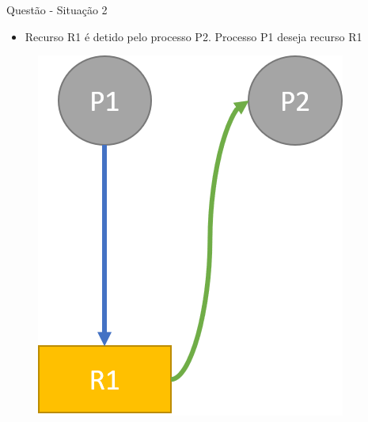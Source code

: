 \documentclass[aspectratio=169,
				xcolor=table]{beamer}
\begin{document}
		
	\begin{frame}{Questão - Situação 2}
		\begin{itemize}
			\item Recurso R1 é detido pelo processo P2. Processo P1 deseja recurso R1
		\end{itemize}
		\begin{figure}
			\centering
			\includegraphics[keepaspectratio, height=0.7\paperheight]{../figs/cap07/exercicio03.png}			
		\end{figure}		
	\end{frame}	
			
\end{document}
